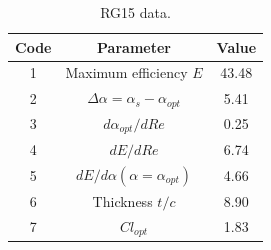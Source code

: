 \documentclass[../TFG_Annex.tex]{subfiles}
\begin{document}
\begin{table}[h!]
	\centering
	\begin{tabular}{c|c|c}
		Code & Parameter                                    & Value  \\ \hline
		1    & Maximum efficiency $E$                      &  43.48   \\
		2    & $\Delta \alpha=\alpha_{s}-\alpha_{opt}$    &        5.41         \\
		3    & ${d\alpha_{opt}}/{dRe}$                     &           0.25     \\
		4    & ${dE}/{dRe}$                                &        6.74    \\
		5    & ${dE}/{d \alpha} (\alpha=\alpha_{opt})$      &           4.66        \\
		6    & Thickness $t/c$                            &              8.90      \\
		7    & $Cl_{opt}$  &   1.83
	\end{tabular}
	\caption{RG15 data.}
	\label{tab:Airf18}
\end{table}
\end{document}
